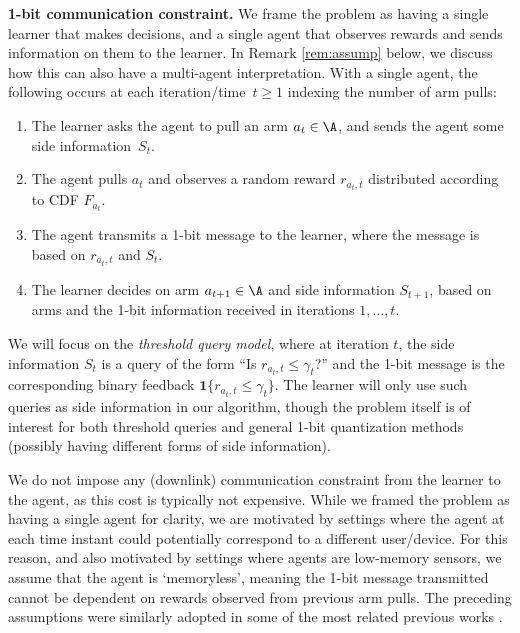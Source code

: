 \textbf{1-bit communication constraint.} We frame the problem as having a single learner that makes decisions, and a single agent that observes rewards and sends information on them to the learner. In Remark \ref{rem:assump} below, we discuss how this can also have a multi-agent interpretation. 
% 
With a single agent, the following occurs at each iteration/time~$t \ge 1$ indexing the number of arm pulls:
\begin{enumerate}[topsep=0pt, itemsep=0pt]
    \item The learner asks the agent
    to pull an arm $a_t \in \A$, and sends the agent some side information~$S_t$.

    \item The agent pulls $a_t$ and observes a random reward $r_{a_t, t}$
    distributed according to CDF $F_{a_t}$.
    
    \item The agent transmits a 1-bit message to the learner, where the message is based on $r_{a_t, t}$ and $S_t$.

    \item The learner decides on arm $a_{t+1} \in \A$ and side information $S_{t+1}$,
    based on arms and the 1-bit information
    received in iterations $1, \ldots, t$.
   
\end{enumerate}
We will focus on the \emph{threshold query model}, where at iteration $t$, the side information $S_t$ is a query of the form 
``Is $r_{a_t, t} \le \gamma_t$?'' and the 1-bit message is the corresponding binary feedback $\boldsymbol{1}\{ r_{a_t,t} \le \gamma_t \}$.
The learner will only use such queries as side information in our algorithm, though the problem itself is of interest for both threshold queries and general 1-bit quantization methods (possibly having different forms of side information).


\begin{remark} \label{rem:assump}
    We do not impose any (downlink) communication constraint from the learner to the agent, as this cost is typically not expensive.  While we framed the problem as having a single agent for clarity, we are motivated by settings where the agent at each time instant could potentially correspond to a different user/device.  For this reason, and also motivated by settings where agents are low-memory sensors, we assume that the agent is `memoryless', meaning the 1-bit message transmitted cannot be dependent on rewards observed from previous arm pulls.  The preceding assumptions were similarly adopted in some of the most related previous works \cite{hanna2022solving, mitra2023linear, mayekar2023communication}.
\end{remark}



